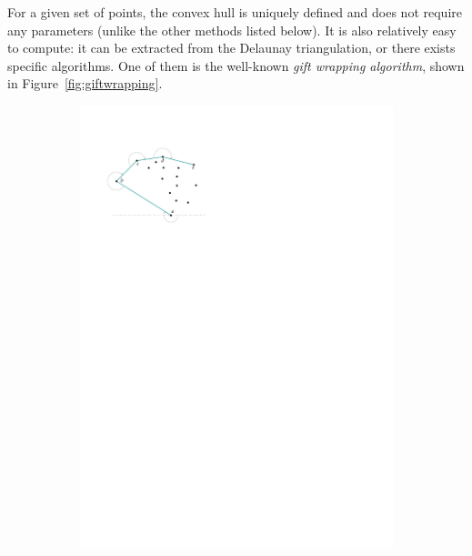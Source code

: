 For a given set of points, the convex hull is uniquely defined and does not require any parameters (unlike the other methods listed below).
It is also relatively easy to compute: it can be extracted from the Delaunay triangulation, or there exists specific algorithms.
One of them is the well-known \emph{gift wrapping algorithm}, shown in Figure~\ref{fig:giftwrapping}.
\begin{figure}
  \centering
  \centering
  \begin{subfigure}[b]{0.3\linewidth}
    \centering
    \includegraphics[page=1,width=\textwidth]{figs/giftwrapping.pdf}
    \caption{}
  \end{subfigure}%
  \qquad
  \begin{subfigure}[b]{0.3\linewidth}
    \centering

\end{subfigure}
\end{figure}
